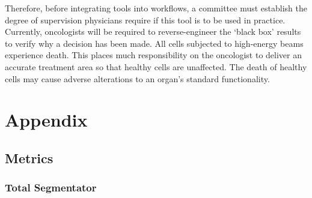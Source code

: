 \documentclass[11pt,twoside]{report}
\begin{document}
Therefore, before integrating tools into workflows, a committee must establish the degree of supervision physicians require if this tool is to be used in practice. Currently, oncologists will be required to reverse-engineer the `black box' results to verify why a decision has been made. All cells subjected to high-energy beams experience death. This places much responsibility on the oncologist to deliver an accurate treatment area so that healthy cells are unaffected. The death of healthy cells may cause adverse alterations to an organ's standard functionality.





\clearpage

\appendix

\chapter{Appendix}

\section{Metrics}

\subsection{Total Segmentator}\label{sect:totalsegmentator-appendix}
\end{document}
